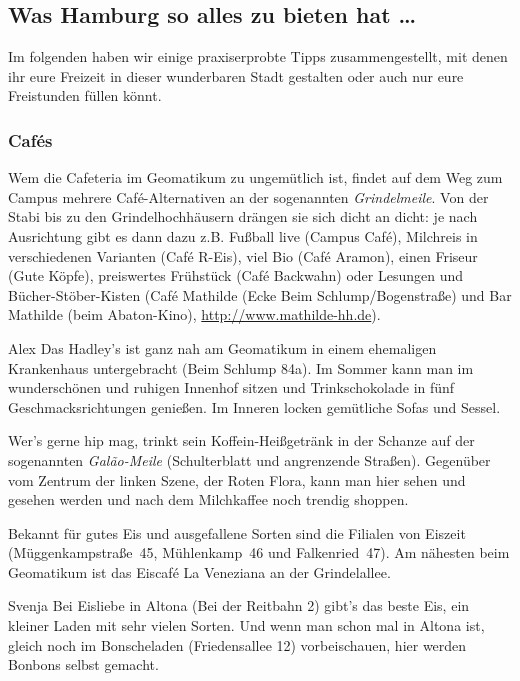 \subsection{Was Hamburg so alles zu bieten hat \dots}

Im folgenden haben wir einige praxiserprobte Tipps zusammengestellt, mit denen
ihr eure Freizeit in dieser wunderbaren Stadt gestalten oder auch nur eure
Freistunden füllen könnt.

\subsubsection{Caf\'es}

Wem die Cafeteria im Geomatikum zu ungemütlich ist, findet auf dem Weg zum
Campus mehrere Caf\'e-Alternativen an der sogenannten \emph{Grindelmeile}.  Von
der Stabi bis zu den Grindelhochhäusern drängen sie sich dicht an dicht: je
nach Ausrichtung gibt es dann dazu z.B. Fußball live (Campus Caf\'e), Milchreis
in verschiedenen Varianten (Caf\'e R-Eis), viel Bio (Caf\'e Aramon), einen
Friseur (Gute Köpfe), preiswertes Frühstück (Caf\'e Backwahn) oder Lesungen und
Bücher-Stöber-Kisten (Caf\'e Mathilde (Ecke Beim Schlump/Bogenstraße) und Bar
Mathilde (beim Abaton-Kino), \url{http://www.mathilde-hh.de}).

\begin{advice}{Alex}
Das Hadley's ist ganz nah am Geomatikum in einem ehemaligen Krankenhaus
untergebracht (Beim Schlump 84a). Im Sommer kann man im wunderschönen und
ruhigen Innenhof sitzen und Trinkschokolade in fünf Geschmacksrichtungen
genießen. Im Inneren locken gemütliche Sofas und Sessel.
\end{advice}

Wer's gerne hip mag, trinkt sein Koffein-Heißgetränk in der Schanze auf der
sogenannten \emph{Gal\~{a}o-Meile} (Schulterblatt und angrenzende Straßen).
Gegenüber vom Zentrum der linken Szene, der Roten Flora, kann man hier sehen
und gesehen werden und nach dem Milchkaffee noch trendig shoppen.

Bekannt für gutes Eis und ausgefallene Sorten sind die Filialen von Eiszeit
(Müggenkampstraße~45, Mühlenkamp~46 und Falkenried~47). Am nähesten beim
Geomatikum ist das Eiscaf\'e La Veneziana an der Grindelallee.

\begin{advice}{Svenja}
Bei Eisliebe in Altona (Bei der Reitbahn 2) gibt's das beste Eis, ein kleiner
Laden mit sehr vielen Sorten. Und wenn man schon mal in Altona ist, gleich noch
im Bonscheladen (Friedensallee 12) vorbeischauen, hier werden Bonbons selbst
gemacht.
\end{advice}

